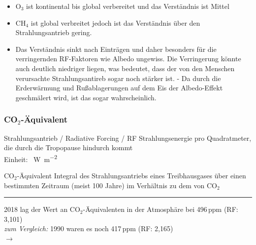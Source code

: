 \begin{frame}
{\begin{itemize}
    \item[] O$_3$ ist kontinental bis global verbereitet und das Verständnis ist Mittel
  	\item[] CH$_4$ ist global verbreitet jedoch ist das Verständnis über den Strahlungsantrieb gering.
  	\item[] Das Verständnis sinkt nach Einträgen und daher besonders für die verringernden RF-Faktoren wie Albedo ungewiss. Die Verringerung könnte auch deutlich niedriger liegen, was bedeutet, dass der von den Menschen verursachte Strahlungsantireb sogar noch stärker ist. - Da durch die Erderwärmung und Rußablagerungen auf dem Eis der Albedo-Effekt geschmälert wird, ist das sogar wahrscheinlich.
  \end{itemize}
  }
\end{frame}


\begin{frame}
	\frametitle{CO$_2$-Äquivalent}

	\begin{block}{Strahlungsantrieb / Radiative Forcing / RF}
		Strahlungsenergie pro Quadratmeter, die durch die Tropopause hindurch kommt \\
		Einheit: \SI{}{\watt\per\square\meter}
	\end{block}

	\begin{block}{CO$_2$-Äquivalent}
		Integral des Strahlungsantriebs eines Treibhausgases über einen bestimmten Zeitraum (meist 100 Jahre) im Verhältnis zu dem von CO$_2$

	\end{block}


	\color{gray}\rule{\linewidth}{1pt}

	\color{black}

	2018 lag der Wert an CO$_2$-Äquivalenten in der Atmosphäre bei 496\,ppm (RF: 3,101)\\
	\textit{zum Vergleich: } 1990 waren es noch 417\,ppm (RF: 2,165)\\
	$\rightarrow$ \color{red}{Zuwachs des Strahlungsantriebs um 43\,\% seit 1990}
\end{frame}

